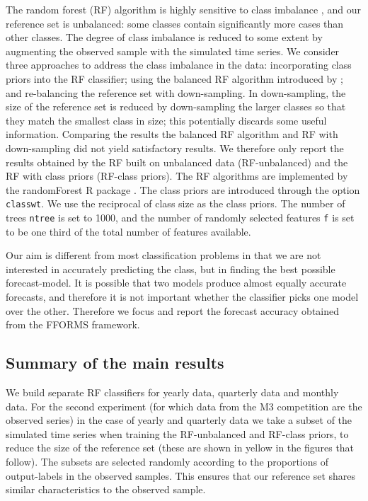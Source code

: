 \documentclass[11pt,a4paper,]{article}
\theoremstyle{definition}
\theoremstyle{definition}
\theoremstyle{definition}
\theoremstyle{remark}
\begin{document}
The random forest (RF) algorithm is highly sensitive to class imbalance
\autocite{breiman2001random}, and our reference set is unbalanced: some
classes contain significantly more cases than other classes. The degree
of class imbalance is reduced to some extent by augmenting the observed
sample with the simulated time series. We consider three approaches to
address the class imbalance in the data: incorporating class priors into
the RF classifier; using the balanced RF algorithm introduced by
\textcite{chen2004using}; and re-balancing the reference set with
down-sampling. In down-sampling, the size of the reference set is
reduced by down-sampling the larger classes so that they match the
smallest class in size; this potentially discards some useful
information. Comparing the results the balanced RF algorithm and RF with
down-sampling did not yield satisfactory results. We therefore only
report the results obtained by the RF built on unbalanced data
(RF-unbalanced) and the RF with class priors (RF-class priors). The RF
algorithms are implemented by the randomForest R package
\autocites{liaw2002randomforest}{rfpkg}. The class priors are introduced
through the option \texttt{classwt}. We use the reciprocal of class size
as the class priors. The number of trees \texttt{ntree} is set to 1000,
and the number of randomly selected features \texttt{f} is set to be one
third of the total number of features available.

Our aim is different from most classification problems in that we are
not interested in accurately predicting the class, but in finding the
best possible forecast-model. It is possible that two models produce
almost equally accurate forecasts, and therefore it is not important
whether the classifier picks one model over the other. Therefore we
focus and report the forecast accuracy obtained from the FFORMS
framework.

\hypertarget{sec:results}{%
\subsection{Summary of the main results}\label{sec:results}}

We build separate RF classifiers for yearly data, quarterly data and
monthly data. For the second experiment (for which data from the M3
competition are the observed series) in the case of yearly and quarterly
data we take a subset of the simulated time series when training the
RF-unbalanced and RF-class priors, to reduce the size of the reference
set (these are shown in yellow in the figures that follow). The subsets
are selected randomly according to the proportions of output-labels in
the observed samples. This ensures that our reference set shares similar
characteristics to the observed sample.
\end{document}
